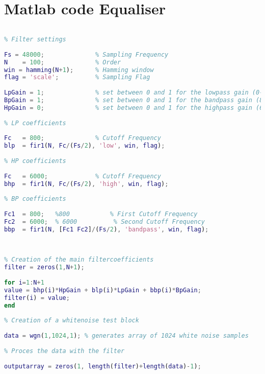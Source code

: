 
\chapter{Matlab code Equaliser} %

\label{AppendixB} %


\begin{lstlisting}[language=Matlab]
% 3 BAND EQ TEST WITH WHITE GAUSSIAN NOISE AND FAST FOUTIER TRANSFORM
 
% Filter settings
 
Fs = 48000;              % Sampling Frequency
N    = 100;              % Order
win = hamming(N+1);      % Hamming window
flag = 'scale';          % Sampling Flag
 
LpGain = 1;              % set between 0 and 1 for the lowpass gain (0-800Hz)
BpGain = 1;              % set between 0 and 1 for the bandpass gain (800 - 6000Hz)
HpGain = 0;              % set between 0 and 1 for the highpass gain (6000 - 24000Hz)
 
% LP coefficients
 
Fc   = 800;              % Cutoff Frequency
blp  = fir1(N, Fc/(Fs/2), 'low', win, flag);
 
% HP coefficients
 
Fc   = 6000;             % Cutoff Frequency
bhp  = fir1(N, Fc/(Fs/2), 'high', win, flag);
 
% BP coefficients
 
Fc1  = 800;   %800           % First Cutoff Frequency
Fc2  = 6000;  % 6000          % Second Cutoff Frequency
bbp  = fir1(N, [Fc1 Fc2]/(Fs/2), 'bandpass', win, flag);
 
 
 
% Creation of the main filtercoefficients
filter = zeros(1,N+1);
 
for i=1:N+1
value = bhp(i)*HpGain + blp(i)*LpGain + bbp(i)*BpGain;
filter(i) = value;
end
 
% Creation of a whitenoise test block
 
data = wgn(1,1024,1); % generates array of 1024 white noise samples
 
% Proces the data with the filter
 
outputarray = zeros(1, length(filter)+length(data)-1);
 

\end{lstlisting}
